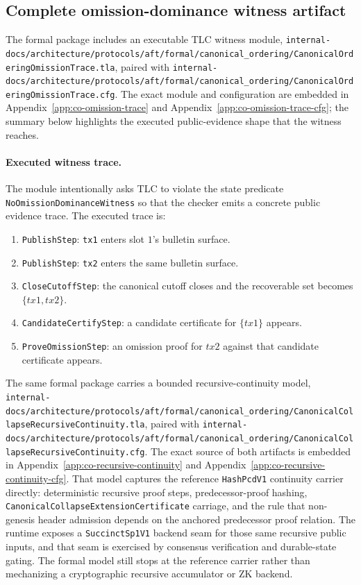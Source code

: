\documentclass[11pt]{article}
\newcommand{\code}[1]{\texttt{#1}}
\begin{document}
\subsection{Complete omission-dominance witness artifact}

The formal package includes an executable TLC witness module,
\code{internal-docs/architecture/protocols/aft/formal/canonical\_ordering/CanonicalOrderingOmissionTrace.tla},
paired with
\code{internal-docs/architecture/protocols/aft/formal/canonical\_ordering/CanonicalOrderingOmissionTrace.cfg}.
The exact module and configuration are embedded in
Appendix~\ref{app:co-omission-trace} and
Appendix~\ref{app:co-omission-trace-cfg}; the summary below highlights the
executed public-evidence shape that the witness reaches.

\paragraph{Executed witness trace.}
The module intentionally asks TLC to violate the state predicate
\code{NoOmissionDominanceWitness} so that the checker emits a concrete public
evidence trace. The executed trace is:

\begin{enumerate}[leftmargin=1.5em]
\item \code{PublishStep}: \code{tx1} enters slot \(1\)'s bulletin surface.
\item \code{PublishStep}: \code{tx2} enters the same bulletin surface.
\item \code{CloseCutoffStep}: the canonical cutoff closes and the recoverable
set becomes \(\{tx1, tx2\}\).
\item \code{CandidateCertifyStep}: a candidate certificate for \(\{tx1\}\)
appears.
\item \code{ProveOmissionStep}: an omission proof for \(tx2\) against that
candidate certificate appears.
\end{enumerate}

The same formal package carries a bounded recursive-continuity model,
\code{internal-docs/architecture/protocols/aft/formal/canonical\_ordering/CanonicalCollapseRecursiveContinuity.tla},
paired with
\code{internal-docs/architecture/protocols/aft/formal/canonical\_ordering/CanonicalCollapseRecursiveContinuity.cfg}.
The exact source of both artifacts is embedded in
Appendix~\ref{app:co-recursive-continuity} and
Appendix~\ref{app:co-recursive-continuity-cfg}.
That model captures the reference \code{HashPcdV1} continuity carrier directly:
deterministic recursive proof steps, predecessor-proof hashing,
\code{CanonicalCollapseExtensionCertificate} carriage, and the rule that
non-genesis header admission depends on the anchored predecessor proof relation.
The runtime exposes a \code{SuccinctSp1V1} backend seam for those
same recursive public inputs, and that seam is exercised by consensus
verification and durable-state gating. The formal model still stops at the
reference carrier rather than mechanizing a cryptographic recursive
accumulator or ZK backend.
\end{document}
